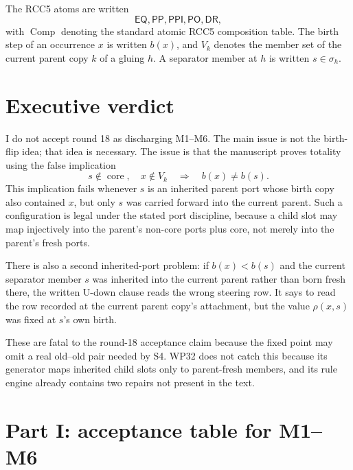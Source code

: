 \documentclass[11pt]{article}
\newcommand{\EQ}{\mathsf{EQ}}
\newcommand{\PP}{\mathsf{PP}}
\newcommand{\PPI}{\mathsf{PPI}}
\newcommand{\PO}{\mathsf{PO}}
\newcommand{\DR}{\mathsf{DR}}
\newcommand{\Comp}{\operatorname{Comp}}
\newcommand{\core}{\operatorname{core}}
\newcommand{\rhoR}{\rho}
\theoremstyle{remark}
\begin{document}
The RCC5 atoms are written
\[
\EQ,\PP,\PPI,\PO,\DR,
\]
with $\Comp$ denoting the standard atomic RCC5 composition table.  The birth step of an occurrence $x$ is written $b(x)$, and $V_k$ denotes the member set of the current parent copy $k$ of a gluing $h$.  A separator member at $h$ is written $s\in\sigma_h$.

\section{Executive verdict}

I do not accept round 18 as discharging M1--M6.  The main issue is not the birth-flip idea; that idea is necessary.  The issue is that the manuscript proves totality using the false implication
\[
  s\notin\core,\quad x\notin V_k
  \quad\Longrightarrow\quad
  b(x)\neq b(s).
\]
This implication fails whenever $s$ is an inherited parent port whose birth copy also contained $x$, but only $s$ was carried forward into the current parent.  Such a configuration is legal under the stated port discipline, because a child slot may map injectively into the parent's non-core ports plus core, not merely into the parent's fresh ports.

There is also a second inherited-port problem: if $b(x)<b(s)$ and the current separator member $s$ was inherited into the current parent rather than born fresh there, the written U-down clause reads the wrong steering row.  It says to read the row recorded at the current parent copy's attachment, but the value $\rhoR(x,s)$ was fixed at $s$'s own birth.

These are fatal to the round-18 acceptance claim because the fixed point may omit a real old--old pair needed by S4.  WP32 does not catch this because its generator maps inherited child slots only to parent-fresh members, and its rule engine already contains two repairs not present in the text.

\section{Part I: acceptance table for M1--M6}
\end{document}

